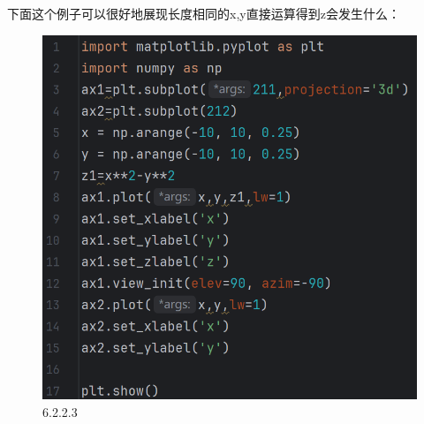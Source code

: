 \documentclass[12pt]{article}
\begin{document}
下面这个例子可以很好地展现长度相同的x,y直接运算得到z会发生什么：
\begin{figure}[H]
    \centering
    \includegraphics[width=0.65\linewidth]{3D mesh program2.png}
    \caption{6.2.2.3}
    \label{fig:enter-label}
\end{figure}
\end{document}
